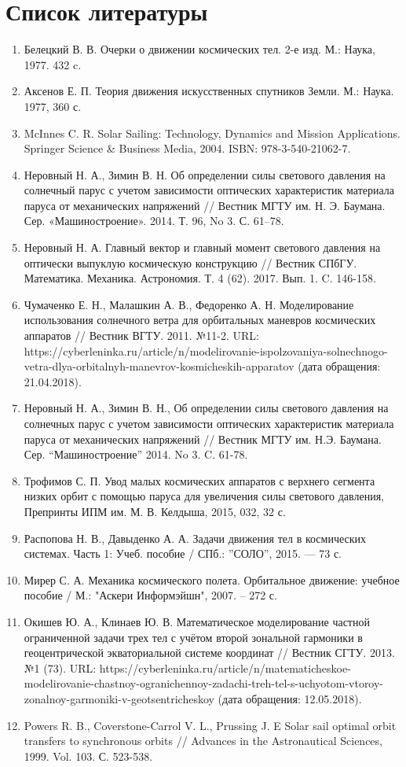 \chapter{Список литературы}
\begin{enumerate}
  \item Белецкий В. В. Очерки о движении космических тел. 2-е изд. М.: Наука, 1977. 432 c.
  \item Аксенов Е. П. Теория движения искусственных спутников Земли. М.: Наука. 1977, 360 с.
  \item McInnes C. R. Solar Sailing: Technology, Dynamics and Mission Applications. Springer Science \&
Business Media, 2004. ISBN: 978-3-540-21062-7.
  \item Неровный Н. А., Зимин В. Н. Об определении силы светового давления на солнечный парус
с учетом зависимости оптических характеристик материала паруса от механических напряжений //
Вестник МГТУ им. Н. Э. Баумана. Сер. «Машиностроение». 2014. Т. 96, No 3. С. 61–78.
  \item Неровный Н. А. Главный вектор и главный момент светового давления на оптически выпуклую космическую конструкцию //
Вестник СПбГУ. Математика. Механика. Астрономия. Т. 4 (62). 2017. Вып. 1. C. 146-158.
  \item Чумаченко Е. Н., Малашкин А. В., Федоренко А. Н. Моделирование использования солнечного ветра
для орбитальных маневров космических аппаратов // Вестник ВГТУ. 2011. №11-2.
URL: https://cyberleninka.ru/article/n/modelirovanie-ispolzovaniya-solnechnogo-vetra-dlya-orbitalnyh-manevrov-kosmicheskih-apparatov (дата обращения: 21.04.2018).
  \item Неровный Н. А., Зимин В. Н., Об определении силы светового давления на солнечных парус
с учетом зависимости оптических характеристик материала паруса от механических напряжений //
Вестник МГТУ им. Н.Э. Баумана. Сер. “Машиностроение” 2014. No 3. C. 61-78.
  \item Трофимов С. П. Увод малых космических аппаратов с верхнего сегмента низких орбит
с помощью паруса для увеличения силы светового давления, Препринты ИПМ им. М. В. Келдыша, 2015, 032, 32 с.
  \item Распопова Н. В., Давыденко А. А. Задачи движения тел в космических системах.
Часть 1: Учеб. пособие / СПб.: ”СОЛО”, 2015. — 73 с.
  \item Мирер С. А. Механика космического полета. Орбитальное движение: учебное пособие /
М.: "Аскери Информэйшн", 2007. -- 272 с.
  \item Окишев Ю. А., Клинаев Ю. В. Математическое моделирование частной ограниченной
задачи трех тел с учётом второй зональной гармоники в геоцентрической экваториальной
системе координат // Вестник СГТУ. 2013. №1 (73). URL:
https://cyberleninka.ru/article/n/matematicheskoe-modelirovanie-chastnoy-ogranichennoy-zadachi-treh-tel-s-uchyotom-vtoroy-zonalnoy-garmoniki-v-geotsentricheskoy
(дата обращения: 12.05.2018).
  \item Powers R. B., Coverstone-Carrol V. L., Prussing J. E Solar sail optimal
  orbit transfers to synchronous orbits // Advances in the Astronautical Sciences, 1999. Vol. 103. С. 523-538.
\end{enumerate}
